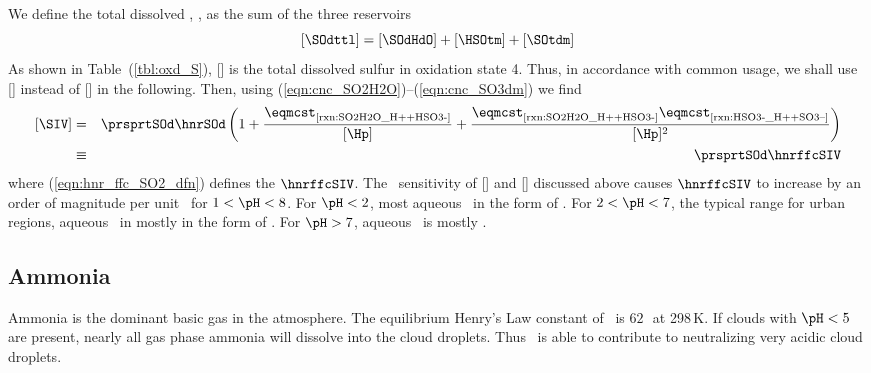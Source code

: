\documentclass[12pt,twoside]{book}
\begin{document}
We define the total dissolved \SOd, \SOdttl, as the sum of the three
reservoirs 
\begin{equation}
[\SOdttl] = [\SOdHdO] + [\HSOtm] + [\SOtdm]
\label{eqn:SO2_ttl_dfn}
\end{equation}
As shown in Table~(\ref{tbl:oxd_S}), [\SOdttl] is the total dissolved
sulfur in oxidation state 4. 
Thus, in accordance with common usage, we shall use [\SIV] instead of
[\SOdttl] in the following.
Then, using (\ref{eqn:cnc_SO2H2O})--(\ref{eqn:cnc_SO3dm}) we find
\begin{eqnarray}
\label{eqn:SO2_ttl_dfn_2}
[\SIV] & = & \prsprtSOd \hnrSOd \left(
1 + \frac{\eqmcst_{\mbox{\scriptsize \ref{rxn:SO2H2O_H++HSO3-}}}}{[\Hp] } + 
\frac{\eqmcst_{\mbox{\scriptsize \ref{rxn:SO2H2O_H++HSO3-}}} \eqmcst_{\mbox{\scriptsize \ref{rxn:HSO3-_H++SO3--}}}}{[\Hp]^{2} }
\right)
\\ %
\label{eqn:hnr_ffc_SO2_dfn}
& \equiv & \prsprtSOd \hnrffcSIV
\end{eqnarray}
where (\ref{eqn:hnr_ffc_SO2_dfn}) defines the  $\hnrffcSIV$.
The \pH\ sensitivity of [\HSOtm] and [\SOtdm] discussed above causes 
$\hnrffcSIV$ to increase by an order of magnitude per unit \pH\ for 
$1 < \pH < 8$.
For $\pH < 2$, most aqueous \SIV\ in the form of \SOdHdO.
For $2 < \pH < 7$, the typical range for urban regions, aqueous \SIV\ 
in mostly in the form of \HSOtm. 
For $\pH > 7$, aqueous \SIV\ is mostly \SOtdm.

\subsection[Ammonia]{Ammonia \NHt}\label{sxn:aqs_eqm_NH3}
Ammonia is the dominant basic gas in the atmosphere.
The equilibrium Henry's Law constant of \NHt\ is  $62$\,\Mxatm\ at
298\,K\@.  
If clouds with $\pH < 5$ are present, nearly all gas phase ammonia
will dissolve into the cloud droplets.
Thus \NHt\ is able to contribute to neutralizing very acidic cloud
droplets. 
\end{document}
